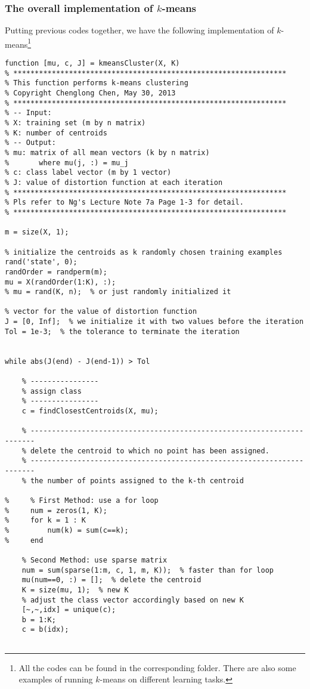 \documentclass{article}
\begin{document}
\subsubsection{The overall implementation of $k$-means}
Putting previous codes together, we have the following implementation of $k$-means\footnote{All the codes can be found in the corresponding folder. There are also some examples of running $k$-means on different learning tasks.}
\begin{verbatim}
function [mu, c, J] = kmeansCluster(X, K)
% ****************************************************************
% This function performs k-means clustering
% Copyright Chenglong Chen, May 30, 2013
% ****************************************************************
% -- Input:
% X: training set (m by n matrix)
% K: number of centroids
% -- Output:
% mu: matrix of all mean vectors (k by n matrix)
%       where mu(j, :) = mu_j
% c: class label vector (m by 1 vector)
% J: value of distortion function at each iteration
% ****************************************************************
% Pls refer to Ng's Lecture Note 7a Page 1-3 for detail.
% ****************************************************************

m = size(X, 1);

% initialize the centroids as k randomly chosen training examples
rand('state', 0);
randOrder = randperm(m);
mu = X(randOrder(1:K), :);
% mu = rand(K, n);  % or just randomly initialized it

% vector for the value of distortion function
J = [0, Inf];  % we initialize it with two values before the iteration
Tol = 1e-3;  % the tolerance to terminate the iteration


while abs(J(end) - J(end-1)) > Tol

    % ----------------
    % assign class
    % ----------------
    c = findClosestCentroids(X, mu);

    % -----------------------------------------------------------------------
    % delete the centroid to which no point has been assigned.
    % -----------------------------------------------------------------------
    % the number of points assigned to the k-th centroid

%     % First Method: use a for loop
%     num = zeros(1, K);
%     for k = 1 : K
%         num(k) = sum(c==k);
%     end

    % Second Method: use sparse matrix
    num = sum(sparse(1:m, c, 1, m, K));  % faster than for loop
    mu(num==0, :) = [];  % delete the centroid
    K = size(mu, 1);  % new K
    % adjust the class vector accordingly based on new K
    [~,~,idx] = unique(c);
    b = 1:K;
    c = b(idx);


\end{verbatim}
\end{document}
